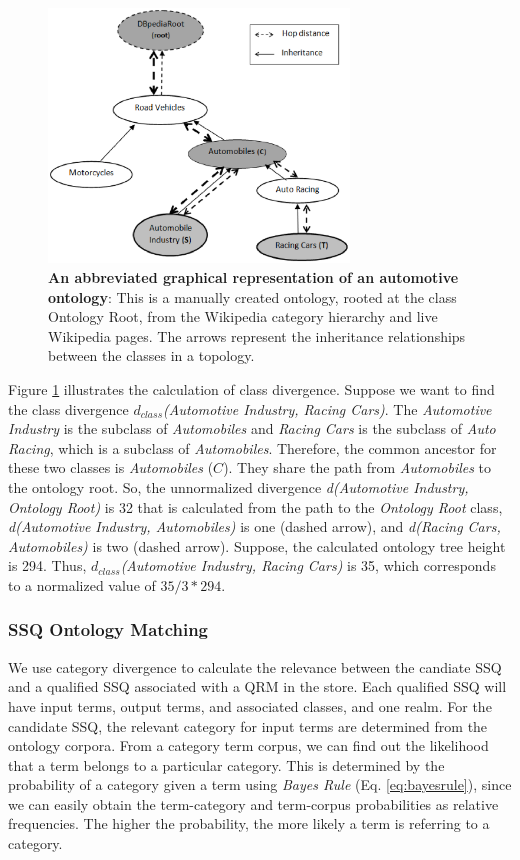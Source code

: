 \begin{figure}[t]
\centering
\includegraphics[width=80mm]{img/class_divergence.eps}
\caption{\textbf{An abbreviated graphical representation of an automotive
ontology}: This is a manually created ontology, rooted at the class Ontology
Root, from the Wikipedia category hierarchy and live Wikipedia pages. The arrows
represent the inheritance relationships between the classes in a topology.}
\label{fig:class_divergence}
\end{figure}

Figure \ref{fig:class_divergence} illustrates the calculation of class
divergence. Suppose we want to find the class divergence
$d_{class}$\textit{(Automotive
  Industry, Racing Cars)}. The \textit{Automotive Industry} is the
subclass of \textit{Automobiles} and \textit{Racing Cars} is the
subclass of \textit{Auto Racing}, which is a subclass of \textit{Automobiles}. 
Therefore, the common ancestor for
these two classes is \textit{Automobiles} ($C$). They share
the path from \textit{Automobiles} to the ontology root. So, the unnormalized
divergence \textit{d(Automotive Industry, Ontology Root)} is 32 that is
calculated from the path to the \textit{Ontology Root} class,
\textit{d(Automotive Industry,
Automobiles)} is one
(dashed arrow), and \textit{d(Racing Cars, Automobiles)} is two
(dashed arrow). Suppose, the calculated ontology tree height is 294. Thus,
$d_{class}$\textit{(Automotive Industry, Racing Cars)} is 35, 
which corresponds to a normalized value of $35/3*294$.

\subsubsection{SSQ Ontology Matching}
\label{sec:oqom}

We use category divergence to calculate the relevance between the candiate SSQ and a qualified SSQ associated with a QRM in the store. Each qualified SSQ will have input terms, output terms, and associated classes, and one realm. For the
candidate SSQ, the relevant category for input terms are determined from the
ontology corpora. From a category term corpus, we can find out the likelihood that a term belongs to a particular category. This is determined by the probability of a category given a term using \textit{Bayes Rule} (Eq. \ref{eq:bayesrule}), since we can easily obtain the term-category and term-corpus probabilities as relative frequencies. The higher the probability, the more likely a term is referring to a category. 

